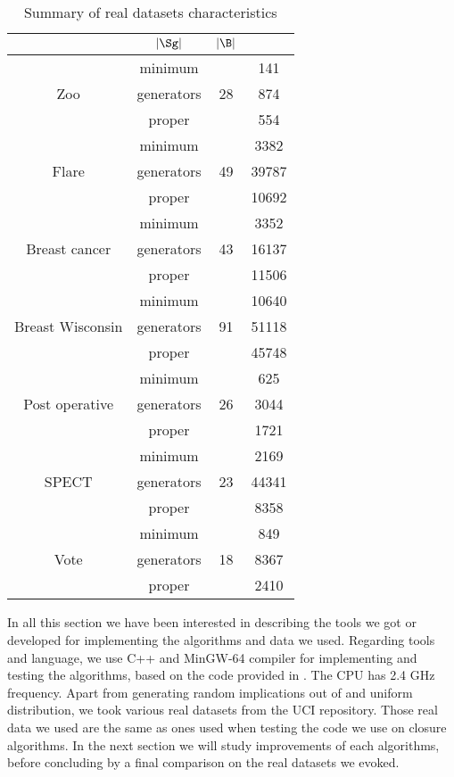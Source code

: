 \begin{table}[ht]
	\centering
	\begin{tabular}{| c | c | c | c |}
		\hline \rowcolor{clouds}
		\multicolumn{2}{|c|}{$\I$} & $|\Sg|$ & $|\B|$ \\ \hline
		\multirow{3}{*}{Zoo} & minimum & \multirow{3}{*}{28} & 141 \\
		& generators & & 874 \\
		& proper & & 554 \\ \hline
		
		\multirow{3}{*}{Flare} & minimum & \multirow{3}{*}{49} & 3382 \\
		& generators & & 39787 \\
		& proper & & 10692 \\ \hline
		
		\multirow{3}{*}{Breast cancer} & minimum & \multirow{3}{*}{43} & 3352 \\
		& generators & & 16137 \\
		& proper & & 11506 \\ \hline
		
		\multirow{3}{*}{Breast Wisconsin} & minimum & \multirow{3}{*}{91} & 10640 \\
		& generators & & 51118 \\
		& proper & & 45748 \\ \hline
		
		\multirow{3}{*}{Post operative} & minimum & \multirow{3}{*}{26} & 625 \\
		& generators & & 3044 \\
		& proper & & 1721 \\ \hline
		
		\multirow{3}{*}{SPECT} & minimum & \multirow{3}{*}{23} & 2169 \\
		& generators & & 44341 \\
		& proper & & 8358 \\ \hline
		
		\multirow{3}{*}{Vote} & minimum & \multirow{3}{*}{18} & 849 \\
		& generators & & 8367 \\
		& proper & & 2410 \\ \hline
	\end{tabular}
\caption{Summary of real datasets characteristics}
\label{tab:real-DS}
\end{table}


In all this section we have been interested in describing the tools we got or developed for implementing the algorithms and data we used. Regarding tools and language, we use C++ and MinGW-64 compiler for implementing and testing the algorithms, based on the code provided in \cite{bazhanov_optimizations_2014}. The CPU has 2.4 GHz frequency. Apart from generating random implications out
of  and uniform distribution, we took various real datasets from the UCI repository. Those real data we used are the same as ones used when testing the code we use on closure algorithms. In the next section we will study improvements of each algorithms, before concluding by a final comparison on 
the real datasets we evoked.

